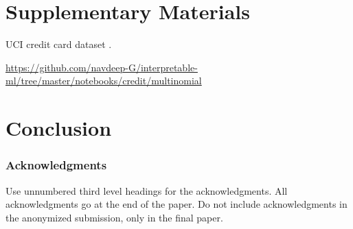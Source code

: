 \documentclass{article}
\begin{document}
\section{Supplementary Materials}


UCI credit card dataset \cite{uci}.

\begin{center}
  \url{https://github.com/navdeep-G/interpretable-ml/tree/master/notebooks/credit/multinomial}
\end{center}


\section{Conclusion}

\subsubsection*{Acknowledgments}
Use unnumbered third level headings for the acknowledgments. All
acknowledgments go at the end of the paper. Do not include
acknowledgments in the anonymized submission, only in the final paper.




\end{document}
